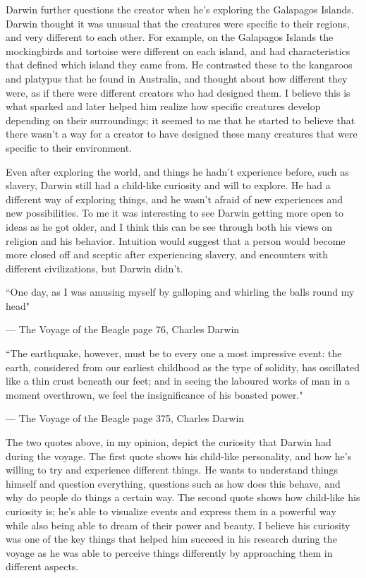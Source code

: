 \documentclass[11pt, oneside]{article}
\begin{document}
\par Darwin further questions the creator when he's exploring the Galapagos Islands. Darwin thought it was unusual that the creatures were specific to their regions, and very different to each other. For example, on the Galapagos Islands the mockingbirds and tortoise were different on each island, and had characteristics that defined which island they came from. He contrasted these to the kangaroos and platypus that he found in Australia, and thought about how different they were, as if there were different creators who had designed them. I believe this is what sparked and later helped him realize how specific creatures develop depending on their surroundings; it seemed to me that he started to believe that there wasn't a way for a creator to have designed these many creatures that were specific to their environment. 


\par Even after exploring the world, and things he hadn't experience before, such as slavery, Darwin still had a child-like curiosity and will to explore. He had a different way of exploring things, and he wasn't afraid of new experiences and new possibilities. To me it was interesting to see Darwin getting more open to ideas as he got older, and I think this can be see through both his views on religion and his behavior. Intuition would suggest that a person would become more closed off and sceptic after experiencing slavery, and encounters with different civilizations, but Darwin didn't. 

\epigraph{``One day, as I was amusing myself by galloping and whirling the balls round my head"}{--- \textup{The Voyage of the Beagle page 76, Charles Darwin}}

\epigraph{``The earthquake, however, must be to every one a most impressive event: the earth, considered from our earliest childhood as the type of solidity, has oscillated like a thin crust beneath our feet; and in seeing the laboured works of man in a moment overthrown, we feel the insignificance of his boasted power."}{--- \textup{The Voyage of the Beagle page 375, Charles Darwin}}

\par The two quotes above, in my opinion, depict the curiosity that Darwin had during the voyage. The first quote shows his child-like personality, and how he's willing to try and experience different things. He wants to understand things himself and question everything, questions such as how does this behave, and why do people do things a certain way. The second quote shows how child-like his curiosity is; he's able to visualize events and express them in a powerful way while also being able to dream of their power and beauty. I believe his curiosity was one of the key things that helped him succeed in his research during the voyage as he was able to perceive things differently by approaching them in different aspects. 
\end{document}

